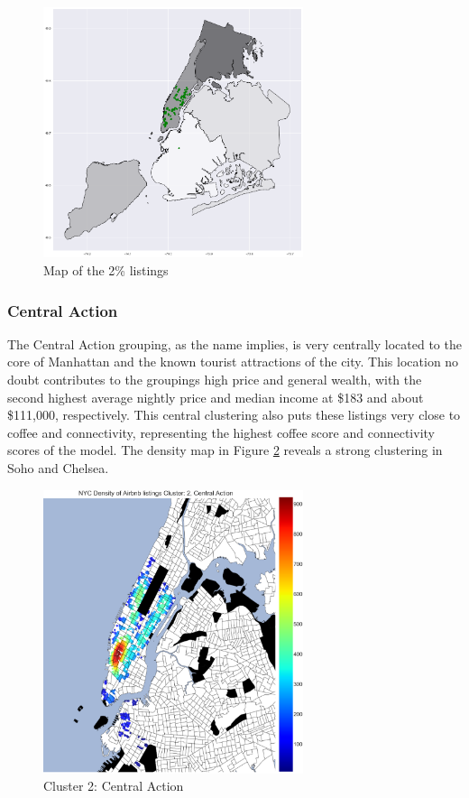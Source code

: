 \documentclass[conference]{IEEEtran}
\begin{document}
\begin{figure}[h]
\centering
\includegraphics[width=3in]{group-2}
\caption{Map of the 2\% listings}
\label{2percent-map}
\end{figure}

\subsubsection{Central Action}
The Central Action grouping, as the name implies, is very centrally located to the core of Manhattan and the known tourist attractions
of the city. This location no doubt contributes to the groupings high price and general wealth, with the second highest average
nightly price and median income at \$183 and about \$111,000, respectively. This central clustering also puts these listings
very close to coffee and connectivity, representing the highest coffee score and connectivity scores of the model. The density map in 
Figure \ref{Clustercentral} reveals a strong clustering in Soho and Chelsea.

\begin{figure}[h]
\centering
\includegraphics[width=3in]{Clustercentral}
\caption{Cluster 2: Central Action}
\label{Clustercentral}
\end{figure}
\end{document}
